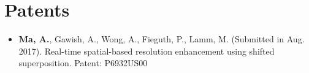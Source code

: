 \section*{Patents}
    \vspace{\postsubhead}
    \begin{adjustwidth}{\indentleft}{\indentright}
    \begin{itemize}
        \item \textbf{Ma, A.}, Gawish, A., Wong, A., Fieguth, P., Lamm, M. (Submitted in Aug. 2017). Real-time spatial-based resolution enhancement using shifted superposition. Patent: P6932US00
      \end{itemize}
    \end{adjustwidth}
    \vspace{\postsection}